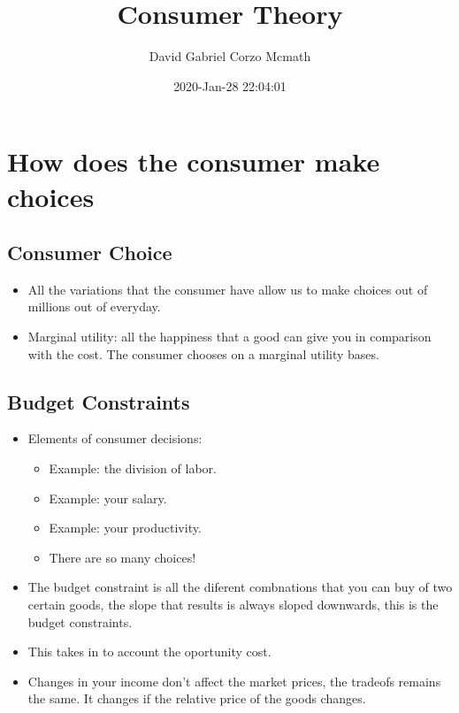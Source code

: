 \documentclass{article}
\title{Consumer Theory}
\author{David Gabriel Corzo Mcmath}
\date{2020-Jan-28 22:04:01}
\begin{document}
\maketitle

\section{How does the consumer make choices}

\subsection{Consumer Choice}
\begin{itemize}
    \item All the variations that the consumer have allow us to make choices out of millions out of everyday.
    \item Marginal utility: all the happiness that a good can give you in comparison with the cost. The consumer chooses on a marginal utility bases.
\end{itemize}


\subsection{Budget Constraints}
\begin{itemize}
    \item Elements of consumer decisions: 
        \begin{itemize}
            \item Example: the division of labor.
            \item Example: your salary.
            \item Example: your productivity.
            \item There are so many choices! 
        \end{itemize}
    
    \item The budget constraint is all the diferent combnations that you can buy of two certain goods, the slope that results is always sloped downwards, this is the budget constraints.
    \item This takes in to account the oportunity cost.
    \item Changes in your income don't affect the market prices, the tradeofs remains the same. It changes if the relative price of the goods changes.
\end{itemize}
\end{document}

